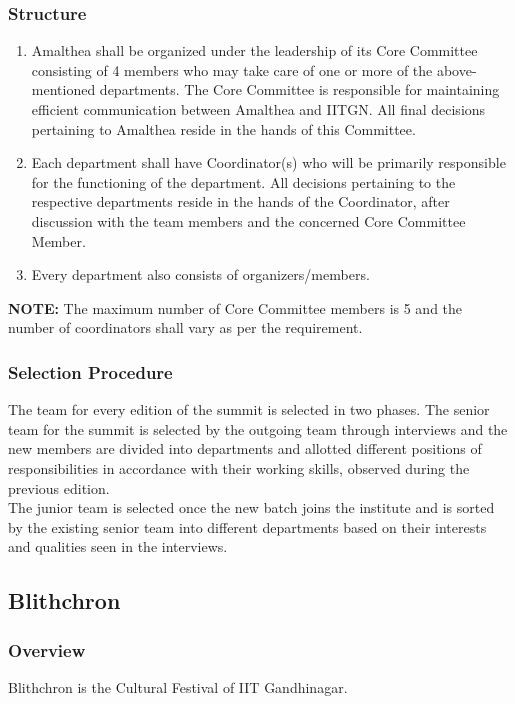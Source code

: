 \documentclass[12pt]{article}
\begin{document}
\subsubsection{Structure}
\begin{enumerate}
    \item Amalthea shall be organized under the leadership of its Core Committee consisting of 4 members who may take care of one or more of the above-mentioned departments. The Core Committee is responsible for maintaining efficient communication between Amalthea and IITGN. All final decisions pertaining to Amalthea reside in the hands of this Committee.
    \item Each department shall have Coordinator(s) who will be primarily responsible for the functioning of the department. All decisions pertaining to the respective departments reside in the hands of the Coordinator, after discussion with the team members and the concerned Core Committee Member.
    \item Every department also consists of organizers/members.
\end{enumerate}
\textbf{NOTE:} The maximum number of Core Committee members is 5 and the number of coordinators shall vary as per the requirement. 

\subsubsection{Selection Procedure}
The team for every edition of the summit is selected in two phases. The senior team for the summit is selected by the outgoing team through interviews and the new members are divided into departments and allotted different positions of responsibilities in accordance with their working skills, observed during the previous edition.\\

\noindent The junior team is selected once the new batch joins the institute and is sorted by the existing senior team into different departments based on their interests and qualities seen in the interviews.

\subsection{Blithchron}
\subsubsection{Overview}
Blithchron is the Cultural Festival of IIT Gandhinagar.
\end{document}
